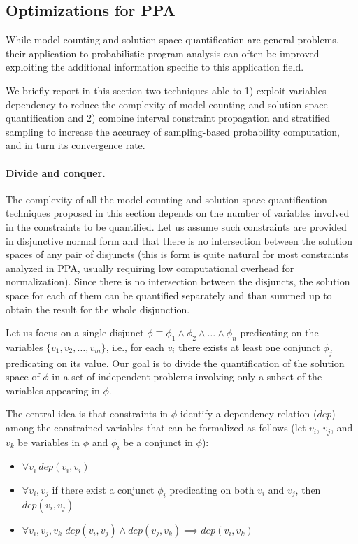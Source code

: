 \subsection{Optimizations for PPA}\label{sec:computingprobabilitiesOptimizations}

While model counting and solution space quantification are general problems, their application to probabilistic program analysis can often be improved exploiting the additional information specific to this application field.

We briefly report in this section two techniques able to 1) exploit variables dependency to reduce the complexity of model counting and solution space quantification and 2) combine interval constraint propagation and stratified sampling to increase the accuracy of sampling-based probability computation, and in turn its convergence rate.

\paragraph{Divide and conquer.}
The complexity of all the model counting and solution space quantification techniques proposed in this section depends on the number of variables involved in the constraints to be quantified. Let us assume such constraints are provided in disjunctive normal form and that there is no intersection between the solution spaces of any pair of disjuncts (this is form is quite natural for most constraints analyzed in PPA, usually requiring low computational overhead for normalization). Since there is no intersection between the disjuncts, the solution space for each of them can be quantified separately and than summed up to obtain the result for the whole disjunction.

Let us focus on a single disjunct $\phi \equiv \phi_1 \land \phi_2 \land \dots \land \phi_n$ predicating on the variables $\{v_1, v_2, \dots, v_m\}$, i.e., for each $v_i$ there exists at least one conjunct $\phi_j$ predicating on its value. Our goal is to divide the quantification of the solution space of $\phi$ in a set of independent problems involving only a subset of the variables appearing in $\phi$. 

The central idea is that constraints in $\phi$ identify a dependency relation ($\textit{dep}$) among the constrained variables that can be formalized as follows (let $v_i$, $v_j$, and $v_k$ be variables in $\phi$ and $\phi_i$ be a conjunct in $\phi$):
\begin{itemize}
	\item $\forall v_i \ \textit{dep}(v_i,v_i)$
	\item $\forall v_i,v_j$ if there exist a conjunct $\phi_i$ predicating on both $v_i$ and $v_j$, then $\textit{dep}(v_i,v_j)$
	\item $\forall v_i,v_j,v_k$ $\textit{dep}(v_i,v_j) \land \textit{dep}(v_j,v_k) \implies \textit{dep}(v_i,v_k)$
\end{itemize}

